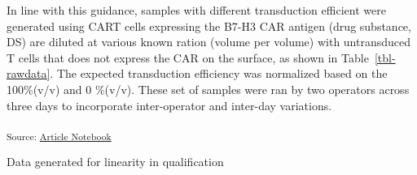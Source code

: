 \documentclass[
]{agujournal2019}
\begin{document}
In line with this guidance, samples with different transduction
efficient were generated using CART cells expressing the B7-H3 CAR
antigen (drug substance, DS) are diluted at various known ration (volume
per volume) with untransduced T cells that does not express the CAR on
the surface, as shown in Table~\ref{tbl-rawdata}. The expected
transduction efficiency was normalized based on the 100\%(v/v) and 0
\%(v/v). These set of samples were ran by two operators across three
days to incorporate inter-operator and inter-day variations.

\textsubscript{Source:
\href{https://jinkaiteo.github.io/quarto-template/index.qmd.html}{Article
Notebook}}

\begin{table}

\caption{\label{tbl-rawdata}Data generated for linearity in
qualification}

\centering{

}
\end{table}
\end{document}
